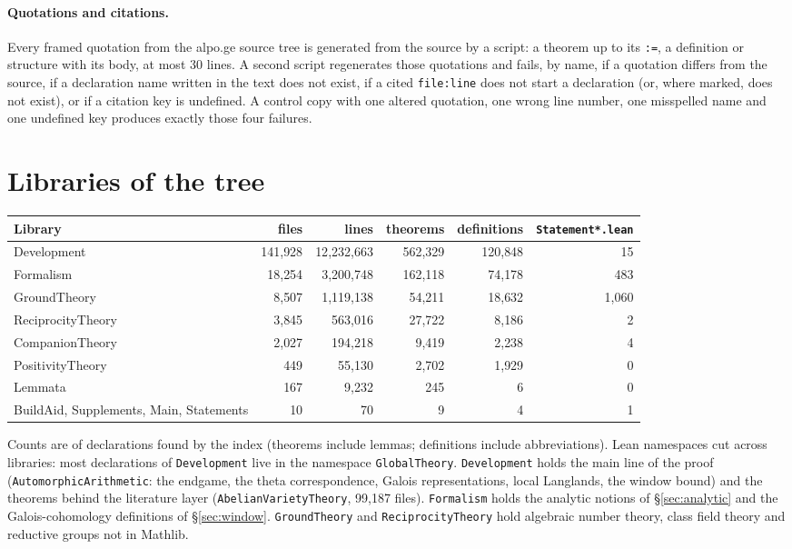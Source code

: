 \paragraph{Quotations and citations.} Every framed quotation from the alpo.ge source tree is generated from the source by a
script: a theorem up to its \texttt{:=}, a definition or structure with its body, at most 30 lines. A
second script regenerates those quotations and fails, by name, if a quotation differs from the source,
if a declaration name written in the text does not exist, if a cited \texttt{file:line} does not start a
declaration (or, where marked, does not exist), or if a citation key is undefined. A control copy with
one altered quotation, one wrong line number, one misspelled name and one undefined key produces
exactly those four failures.

\section{Libraries of the tree}\label{app:libraries}

{\small
\begin{tabular}{@{}lrrrrr@{}}
\toprule
Library & files & lines & theorems & definitions & \texttt{Statement*.lean}\\
\midrule
Development & 141{,}928 & 12{,}232{,}663 & 562{,}329 & 120{,}848 & 15\\
Formalism & 18{,}254 & 3{,}200{,}748 & 162{,}118 & 74{,}178 & 483\\
GroundTheory & 8{,}507 & 1{,}119{,}138 & 54{,}211 & 18{,}632 & 1{,}060\\
ReciprocityTheory & 3{,}845 & 563{,}016 & 27{,}722 & 8{,}186 & 2\\
CompanionTheory & 2{,}027 & 194{,}218 & 9{,}419 & 2{,}238 & 4\\
PositivityTheory & 449 & 55{,}130 & 2{,}702 & 1{,}929 & 0\\
Lemmata & 167 & 9{,}232 & 245 & 6 & 0\\
BuildAid, Supplements, Main, Statements & 10 & 70 & 9 & 4 & 1\\
\bottomrule
\end{tabular}
}

\medskip
\noindent Counts are of declarations found by the index (theorems include lemmas; definitions include
abbreviations). Lean namespaces cut across libraries: most declarations of \texttt{Development} live in
the namespace \texttt{GlobalTheory}. \texttt{Development} holds the main line of the proof
(\texttt{AutomorphicArithmetic}: the endgame, the theta correspondence, Galois representations, local
Langlands, the window bound) and the theorems behind the literature layer
(\texttt{AbelianVarietyTheory}, 99{,}187 files). \texttt{Formalism} holds the analytic notions of
\S\ref{sec:analytic} and the Galois-cohomology definitions of \S\ref{sec:window}. \texttt{GroundTheory}
and \texttt{ReciprocityTheory} hold algebraic number theory, class field theory and reductive groups
not in Mathlib.
